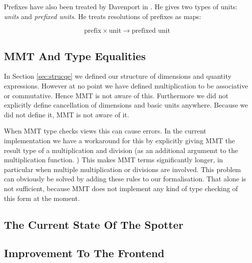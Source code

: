 Prefixes have also been treated by Davenport in \cite{SD:UnitKnowledgeMgmt08}. He gives two types of units: \textit{units} and \textit{prefixed units}. He treats resolutions of prefixes as maps:

\[\text{prefix} \times \text{unit} \rightarrow \text{prefixed unit}\]


\subsection{MMT And Type Equalities}

In Section \ref{sec:strucqe} we defined our structure of dimensions and quantity expressions. However at no point we have defined multiplication to be associative or commutative. Hence MMT is not aware of this. Furthermore we did not explicitly define cancellation of dimensions and basic units anywhere. Because we did not define it, MMT is not aware of it.

When MMT type checks views this can cause errors. In the current implementation we have a workaround for this by explicitly giving MMT the result type of a multiplication and division (as an additional argumemt to the multiplication function. ) This makes MMT terms significantly longer, in particular when multiple multiplication or divisions are involved.  This problem can obviously be solved by adding these rules to our formalisation. That alone is not sufficient, because MMT does not implement any kind of type checking of this form at the moment.

\subsection{The Current State Of The Spotter}

\subsection{Improvement To The Frontend}
\label{sec:fut_res}
